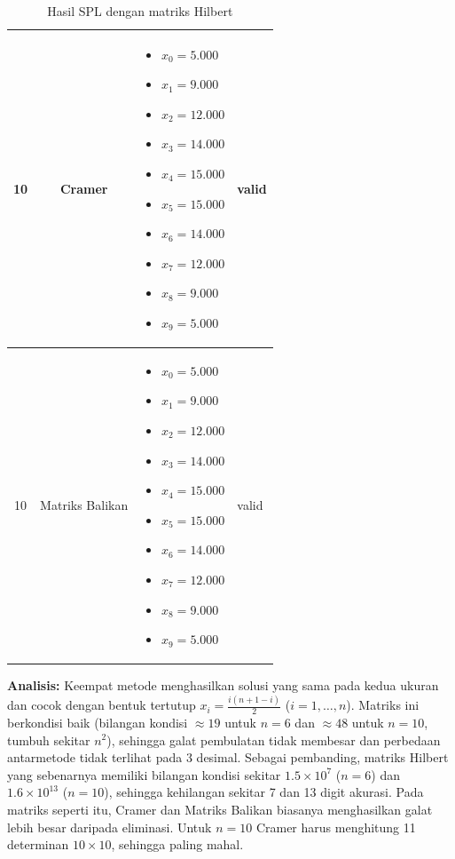 \documentclass[12pt,a4paper]{report}
\begin{document}
\begin{table}[H]
    \centering
    \caption{Hasil SPL dengan matriks Hilbert}
    \begin{tabular}{|c|c|p{5cm}|l|}
        \hline
        10 & Cramer & 
        \begin{itemize}
            \item $x_0 = 5.000$
            \item $x_1 = 9.000$
            \item $x_2 = 12.000$
            \item $x_3 = 14.000$
            \item $x_4 = 15.000$
            \item $x_5 = 15.000$
            \item $x_6 = 14.000$
            \item $x_7 = 12.000$
            \item $x_8 = 9.000$
            \item $x_9 = 5.000$
        \end{itemize}
        & valid \\
        \hline
        10 & Matriks Balikan & 
        \begin{itemize}
            \item $x_0 = 5.000$
            \item $x_1 = 9.000$
            \item $x_2 = 12.000$
            \item $x_3 = 14.000$
            \item $x_4 = 15.000$
            \item $x_5 = 15.000$
            \item $x_6 = 14.000$
            \item $x_7 = 12.000$
            \item $x_8 = 9.000$
            \item $x_9 = 5.000$
        \end{itemize}
        & valid \\
        \hline
    \end{tabular}
\end{table}
 
\textbf{Analisis:} Keempat metode menghasilkan solusi yang sama pada kedua ukuran dan cocok dengan bentuk tertutup $x_i = \tfrac{i(n+1-i)}{2}$ ($i=1,\dots,n$). Matriks ini berkondisi baik (bilangan kondisi $\approx 19$ untuk $n=6$ dan $\approx 48$ untuk $n=10$, tumbuh sekitar $n^2$), sehingga galat pembulatan tidak membesar dan perbedaan antarmetode tidak terlihat pada 3 desimal. Sebagai pembanding, matriks Hilbert yang sebenarnya memiliki bilangan kondisi sekitar $1.5\times10^{7}$ ($n=6$) dan $1.6\times10^{13}$ ($n=10$), sehingga kehilangan sekitar 7 dan 13 digit akurasi. Pada matriks seperti itu, Cramer dan Matriks Balikan biasanya menghasilkan galat lebih besar daripada eliminasi. Untuk $n=10$ Cramer harus menghitung 11 determinan $10\times10$, sehingga paling mahal.
\end{document}
